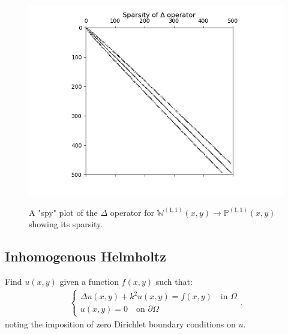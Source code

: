 \documentclass[11pt, oneside]{article}   	%
\newcommand{\bigPii}{{\mathbb{P}^{(1,1)}}}
\newcommand{\bigWii}{{\mathbb{W}^{(1,1)}}}
\begin{document}

\begin{figure}
	\centering
	\includegraphics[scale=0.4]{sparsityoflaplacian}
        \label{fig:sparsity}
    	\caption{A "spy" plot of the $\Delta$ operator for $\bigWii(x,y) \to \bigPii(x,y)$ showing its sparsity.}
	\centering
\end{figure}

\subsection{Inhomogenous Helmholtz}

Find \(u(x,y)\) given a function \(f(x,y)\) such that:
\begin{align}
	\begin{cases}
    		\Delta u(x,y) + k^2 u(x,y) = f(x,y) \quad \text{in } \Omega \\
		u(x,y) = 0 \quad \text{on } \partial \Omega
	\end{cases}.
\end{align}
noting the imposition of zero Dirichlet boundary conditions on $u$.
\end{document}
